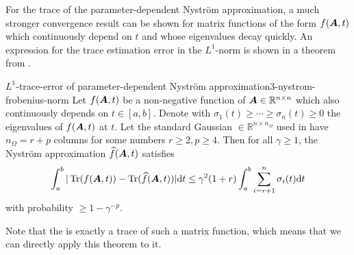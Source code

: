 For the trace of the parameter-dependent Nystr\"om approximation,
a much stronger convergence result can be shown for matrix functions of the form $f(\boldsymbol{A}, t)$
which continuously depend on $t$ and whose eigenvalues decay quickly.
An expression for the trace estimation error in
the $L^1$-norm is shown in a theorem from \cite{he2023parameter}.
\begin{theorem}{$L^1$-trace-error of parameter-dependent Nystr\"om approximation}{3-nystrom-frobenius-norm}
    Let $f(\boldsymbol{A}, t)$ be a non-negative function of $\boldsymbol{A} \in \mathbb{R}^{n \times n}$ which
    also continuously depends on $t \in [a,b]$. 
    Denote with $\sigma_1(t) \geq \cdots \geq \sigma_n(t) \geq 0$ the eigenvalues of $f(\boldsymbol{A}, t)$ at $t$. Let the
    standard Gaussian  $\in \mathbb{R}^{n \times n_{\Omega}}$
    used in  have
    $n_{\Omega} = r + p$ columns for some numbers $r \geq 2, p \geq 4$. Then
    for all $\gamma \geq 1$, the Nystr\"om approximation $\widehat{f}(\boldsymbol{A}, t)$ satisfies
    \begin{equation}
        \int_{a}^{b} | \operatorname{Tr}(f(\boldsymbol{A}, t)) - \operatorname{Tr}(\widehat{f}(\boldsymbol{A}, t))| \mathrm{d}t
            \leq \gamma^2 (1 + r) \int_{a}^{b} \sum_{i = r+1}^n \sigma_i(t) \mathrm{d}t
    \end{equation}
    with probability $\geq 1 - \gamma^{-p}$.
\end{theorem}
Note that the  
is exactly a trace of such a matrix function, which means that we can directly
apply this theorem to it.

